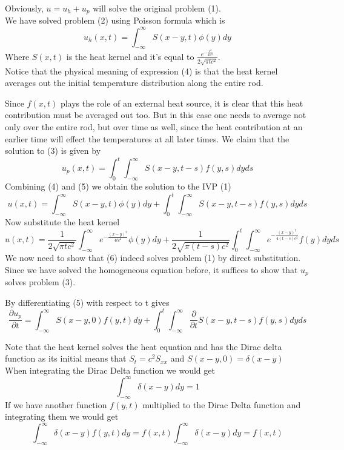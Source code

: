 Obviously, $u = u_h + u_p$ will solve the original problem (1).
\\
We have solved problem (2) using Poisson formula which is
\begin{equation}
    u_h(x,t) = \int_{-\infty}^{\infty}S(x-y,t) \phi(y)dy        
\end{equation}
Where $S(x,t)$ is the heat kernel and it's equal to $\displaystyle \frac{\textstyle e^{-\frac{x^2}{4tc^2}}}{2\sqrt{\pi tc^2}}$.
\\
Notice that the physical meaning of expression (4) is that the heat
kernel averages out the initial temperature distribution along the entire rod.
\par
Since $f(x, t)$ plays the role of an external heat source, it is clear that this heat contribution must be averaged out too. 
But in this case one needs to average not only over the entire rod, but over time as well, 
since the heat contribution at an earlier time will effect the temperatures at all later times. 
We claim that the solution to (3) is given by
\begin{equation}
    u_p(x,t) = \int_{0}^{t}\int_{-\infty}^{\infty}S(x-y,t-s) f(y,s)dyds
\end{equation}
Combining (4) and (5) we obtain the solution to the IVP (1)
\begin{equation}
    u(x,t)  = \int_{-\infty}^{\infty}S(x-y,t) \phi(y)dy + \int_{0}^{t}\int_{-\infty}^{\infty}S(x-y,t-s) f(y,s)dyds
\end{equation}
Now substitute the heat kernel
\[
    u(x,t) = \frac{1}{2\sqrt{\pi tc^2}}\int_{-\infty}^{\infty}e^{\textstyle -\frac{{(x-y)}^2}{4tc^2}} \phi(y)dy + \frac{1}{2\sqrt{\pi (t-s)c^2}} \int_{0}^{t} \int_{-\infty}^{\infty}e^{\textstyle -\frac{{(x-y)}^2}{4(t-s)c^2}} f(y)dyds            
\]
We now need to show that (6) indeed solves problem (1) by direct substitution. 
\\
Since we have solved the homogeneous equation before, it suffices to show that $u_p$ solves problem (3). 
\par
By differentiating (5) with respect to t gives
\[
    \frac{\partial u_p}{\partial t} = \int_{-\infty}^{\infty}S(x-y,0) f(y,t) dy  + \int_{0}^{t}\int_{-\infty}^{\infty}\frac{\partial}{\partial t}S(x-y,t-s) f(y,s)dyds    
\]
\begin{enrichment*}{}
    Note that the heat kernel solves the heat equation and has the Dirac delta function as its initial
    means that $S_t =c^2 S_{xx}$ and $S(x-y,0) = \delta(x-y)$
    \\
    When integrating the Dirac Delta function we would get
    \[
        \int_{-\infty}^{\infty}\delta(x-y) dy = 1
    \]
    If we have another function $f(y,t)$ multiplied to the Dirac Delta function and integrating them we would get
    \[
        \int_{-\infty}^{\infty}\delta(x-y) f(y,t) dy = f(x,t)\int_{-\infty}^{\infty}\delta(x-y) dy = f(x,t) 
    \]
\end{enrichment*}
